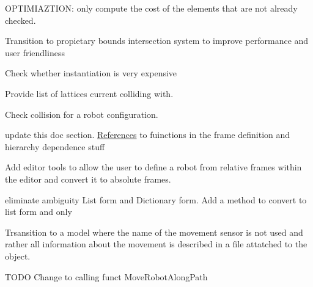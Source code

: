 
\begin{DoxyRefList}
\item[Member \mbox{\hyperlink{class_illa_graph_node_a536aace3c5276651d6870f318f897e02}{Illa\+Graph\+Node.Order\+Dictionary\+Reach\+From\+Origin}} ()]\label{todo__todo000001}%
%
OPTIMIAZTION\+: only compute the cost of the elements that are not already checked.  
\item[Class \mbox{\hyperlink{class_illa_node_sensor_script}{Illa\+Node\+Sensor\+Script}} ]\label{todo__todo000002}%
%
Transition to propietary bounds intersection system to improve performance and user friendliness  
\item[Member \mbox{\hyperlink{class_inchworm_robot_controller_a434da4643498bd898d99a63678492ae4}{Inchworm\+Robot\+Controller.Is\+Pose\+Colliding}} (\mbox{\hyperlink{class_pos_j}{PosJ}} Pose\+To\+Check)]\label{todo__todo000003}%
%
Check whether instantiation is very expensive

\label{todo__todo000004}%
%
Provide list of lattices current colliding with.

\label{todo__todo000005}%
%
Check collision for a robot configuration.  
\item[Class \mbox{\hyperlink{class_joint_class}{Joint\+Class}} ]\label{todo__todo000006}%
%
update this doc section. \mbox{\hyperlink{class_references}{References}} to fuinctions in the frame definition and hierarchy dependence stuff

\label{todo__todo000007}%
%
Add editor tools to allow the user to define a robot from relative frames within the editor and convert it to absolute frames. 
\item[Class \mbox{\hyperlink{class_movement}{Movement}} ]\label{todo__todo000008}%
%
eliminate ambiguity List form and Dictionary form. Add a method to convert to list form and only  
\item[Member \mbox{\hyperlink{class_robot_script_aaaacc0eacd09c68f0e399dfb780c16a3}{Robot\+Script.Get\+Possible\+Movement\+Sensors}} ()]\label{todo__todo000009}%
%
Trsansition to a model where the name of the movement sensor is not used and rather all information about the movement is described in a file attatched to the object. ~\newline
  
\item[Member \mbox{\hyperlink{class_robot_script_a9213947f626c88acf4ce793020a9ef3d}{Robot\+Script.Move\+To\+Node}} (Game\+Object End\+Node)]\label{todo__todo000010}%
%
TODO Change to calling funct Move\+Robot\+Along\+Path 
\end{DoxyRefList}